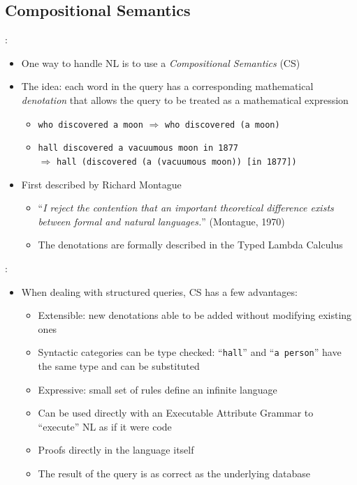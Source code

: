 \documentclass[logoontitle,tabu,supertabular,aspectratio=43]{preney-uwindsor-beamer}
\begin{document}
    \subsection{Compositional Semantics}
    \begin{frame}{\insertsection: \insertsubsection}
        \begin{itemize}
            \item One way to handle NL is to use a {\em Compositional Semantics} (CS)
            \item The idea: each word in the query has a corresponding mathematical {\em denotation} that allows the query to be treated as a mathematical expression
            \begin{itemize}
                \item \texttt{who discovered a moon} $\Rightarrow$ \texttt{who discovered (a moon)}
                \item \texttt{hall discovered a vacuumous moon in 1877} \\ $\Rightarrow$ \texttt{hall (discovered (a (vacuumous moon)) [in 1877])}
            \end{itemize}
            \item First described by Richard Montague \cite{Dowty:wall}
            \begin{itemize}
                \item ``\textit{I reject the contention that an important theoretical difference exists between formal and natural languages.}'' (Montague, 1970)
                \item The denotations are formally described in the Typed Lambda Calculus
            \end{itemize}
        \end{itemize}
    \end{frame}

    \begin{frame}{\insertsection: \insertsubsection}
        \begin{itemize}
            \item When dealing with structured queries, CS has a few advantages:
            \begin{itemize}
                \item Extensible: new denotations able to be added without modifying existing ones
                \item Syntactic categories can be type checked: ``\texttt{hall}'' and ``\texttt{a person}'' have the same type and can be substituted
                \item Expressive: small set of rules define an infinite language
                \item Can be used directly with an Executable Attribute Grammar \cite{frost1989constructing} to ``execute'' NL as if it were code
                \item Proofs directly in the language itself
                \item The result of the query is as correct as the underlying database
            \end{itemize}
        \end{itemize}
    \end{frame}
\end{document}
